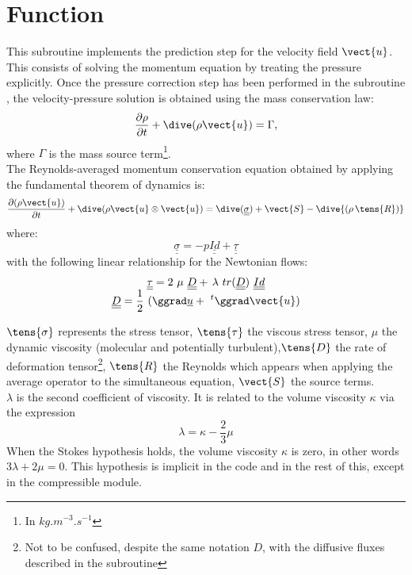 \section*{Function}
This subroutine implements the prediction step for the velocity field $\vect{u}$.
This consists of solving the momentum equation by treating the pressure explicitly.
Once the pressure correction step has been performed in the subroutine ,
the velocity-pressure solution is obtained using the mass conservation law:
\begin{equation}
\frac{\partial \rho } {\partial t}+ \dive(\rho \vect{u}) = \Gamma,
\end{equation}
where $\Gamma$ is the mass source term\footnote{In $kg.m^{-3}.s^{-1}$ }.\\
The Reynolds-averaged momentum conservation equation obtained by applying
the fundamental theorem of dynamics is:
\begin{equation}
\frac {\partial (\rho \vect {u})} {\partial t }+
\dive(\rho \vect{u} \otimes \vect{u}) =
\dive(\underline{\underline{\sigma}}) + \vect{S} - \dive{(\rho\,\tens{R})}\end{equation}
where:
\begin{equation}
\underline{\underline{\sigma}} = - p \underline{\underline{Id}} + \underline{\underline{\tau }}
\end{equation}
with the following linear relationship for the Newtonian flows:
\begin{equation}
\begin{array}{lcl}
&\displaystyle \underline{\underline{\tau}} = 2\ \mu\ \underline{\underline{D}}
+\,
 \lambda\ tr(\underline{\underline{D }})\ \underline{\underline{Id}} &\\
&\displaystyle \underline{\underline{D}}=\frac{1}{2}\ (\ggrad \underline
{u} +\ ^t\ggrad \vect {u})
\end{array}
\end{equation}


$\tens{\sigma}$ represents the stress tensor, $\tens{\tau}$ the viscous stress tensor,
$\mu$ the dynamic viscosity (molecular and potentially turbulent),$\tens{D}$
the rate of deformation tensor\footnote{Not to be confused, despite the same
notation $D$, with the diffusive fluxes described in the subroutine
}, $\tens{R}$ the Reynolds which appears when applying the
average operator to the simultaneous equation, $\vect{S}$ the source
terms.\\
$\lambda$ is the second coefficient of viscosity. It is related to the volume viscosity
 $\kappa$ via the expression
\begin{equation}
\lambda=\kappa-\frac{2}{3}\mu
\end{equation}
When the Stokes hypothesis holds, the volume viscosity $\kappa$ is
zero, in other words $3\lambda+2\mu=0$. This hypothesis is implicit in the code
and in the rest of this, except in the compressible module.\\


